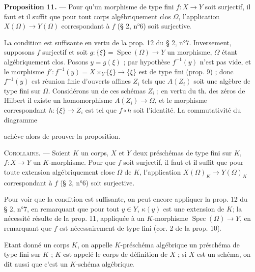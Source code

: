 \noindent\textbf{Proposition 11.} --- Pour qu'un morphisme de type fini $f : X \to Y$ soit surjectif, il faut et il suffit que pour tout corps algébriquement clos $\Omega$, l'application $X(\Omega) \to Y(\Omega)$ correspondant à $f$ (§ 2, n°6) soit surjective.

La condition est suffisante en vertu de la prop. 12 du § 2, n°7. Inversement, supposons $f$ surjectif et soit $g : \{\xi\} = \operatorname{Spec}(\Omega) \to Y$ un morphisme, $\Omega$ étant algébriquement clos. Posons $y = g(\xi)$ ; par hypothèse $f^{-1}(y)$ n'est pas vide, et le morphisme $f' : f^{-1}(y) = X \times_Y \{\xi\} \to \{\xi\}$ est de type fini (prop. 9) ; donc $f^{-1}(y)$ est réunion finie d'ouverts affines $Z_i$ tels que $A(Z_i)$ soit une algèbre de type fini sur $\Omega$. Considérons un de ces schémas $Z_i$ ; en vertu du th. des zéros de Hilbert il existe un homomorphisme $A(Z_i) \to \Omega$, et le morphisme correspondant $h : \{\xi\} \to Z_i$ est tel que $f \circ h$ soit l'identité. La commutativité du diagramme

\newpage


\begin{center}
\end{center}
achève alors de prouver la proposition.

\noindent \textsc{Corollaire}. --- Soient $K$ un corps, $X$ et $Y$ deux préschémas de type fini sur $K$, $f: X \to Y$ un $K$-morphisme. Pour que $f$ soit surjectif, il faut et il suffit que pour toute extension algébriquement close $\Omega$ de $K$, l'application $X(\Omega)_K \to Y(\Omega)_K$ correspondant à $f$ (§ 2, n°6) soit surjective.

Pour voir que la condition est suffisante, on peut encore appliquer la prop. 12 du § 2, n°7, en remarquant que pour tout $y \in Y$, $\kappa(y)$ est une extension de $K$; la nécessité résulte de la prop. 11, appliquée à un $K$-morphisme $\operatorname{Spec}(\Omega) \to Y$, en remarquant que $f$ est nécessairement de type fini (cor. 2 de la prop. 10).

Etant donné un corps $K$, on appelle $K$-préschéma algébrique un préschéma de type fini sur $K$ ; $K$ est appelé le corps de définition de $X$ ; si $X$ est un schéma, on dit aussi que c'est un $K$-schéma algébrique.

